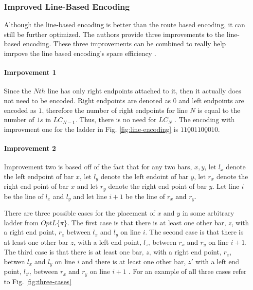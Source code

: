 \subsubsection{Improved Line-Based Encoding}
Although the line-based encoding is better than the route based 
encoding, it can still be further optimized. The authors provide 
three improvements to the line-based encoding. These three improvements
can be combined to really help imrpove the line based encoding's 
space efficiency \cite{A5}. 
\paragraph{Imrpovement 1}
Since the $Nth$ line has only right endpoints attached to it, 
then it actually does not need to be encoded. Right endpoints 
are denoted as $0$ and left endpoints are encoded as $1$, therefore the number of right endpoints 
for line $N$ is equal to the number of $1s$ in $LC_{N-1}$.
Thus, there is no need for $LC_{N}$ \cite{A5}. The encoding with improvment 
one for the ladder in Fig. \ref{fig:line-encoding} is $11\underline{0}0110\underline{0}010$.
\paragraph{Improvement 2}
Improvement two is based off of the fact that for any two bars,
$x,y$, let $l_{x}$ denote the left endpoint of bar $x$, let 
$l_{y}$ denote the left endoint of bar $y$, let $r_{x}$ denote 
the right end point of bar $x$ and let $r_{y}$ denote the right 
end point of bar $y$. Let line $i$ be the line of $l_{x}$ and $l_{y}$
and let line $i+1$ be the line of $r_{x}$ and $r_{y}$.
\begin{lemma}
There are three possible cases for the 
placement of $x$ and $y$ in some 
arbitrary ladder from $OptL\{\pi\}$. The first case is that there 
is at least one other bar, $z$, with a right end point, $r_{z}$ between $l_{x}$
and $l_{y}$ on line $i$. The second case is that there is at least one other bar 
$z$, with a left end point, $l_{z}$, between $r_{x}$ and $r_{y}$ on line $i+1$. 
The third case is that there is at least one bar, $z$, with a right end point, 
$r_{z}$, betwen $l_{x}$ and $l_{y}$ on line $i$ and there is at least one other bar, 
$z\prime$ with a left end point, $l_{z\prime}$, between $r_{x}$ and $r_{y}$ on line $i+1$ \cite{A5}. 
For an example of all three cases refer to Fig. \ref{fig:three-cases}\par
\end{lemma}

